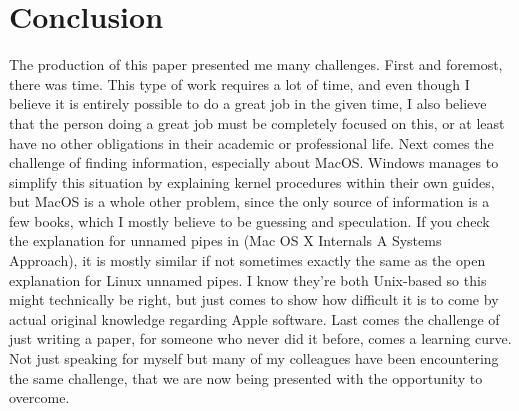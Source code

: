 \documentclass[12pt]{article}
\begin{document}
\section{Conclusion}
	The production of this paper presented me many challenges. First and foremost, there was time. This type of work requires a lot of time, and even though I believe it is entirely possible to do a great job in the given time, I also believe that the person doing a great job must be completely focused on this, or at least have no other obligations in their academic or professional life. Next comes the challenge of finding information, especially about MacOS. Windows manages to simplify this situation by explaining kernel procedures within their own guides, but MacOS is a whole other problem, since the only source of information is a few books, which I mostly believe to be guessing and speculation. If you check the explanation for unnamed pipes in (Mac OS X Internals A Systems Approach), it is mostly similar if not sometimes exactly the same as the open explanation for Linux unnamed pipes. I know they’re both Unix-based so this might technically be right, but just comes to show how difficult it is to come by actual original knowledge regarding Apple software. Last comes the challenge of just writing a paper, for someone who never did it before, comes a learning curve. Not just speaking for myself but many of my colleagues have been encountering the same challenge, that we are now being presented with the opportunity to overcome.


\end{document}
